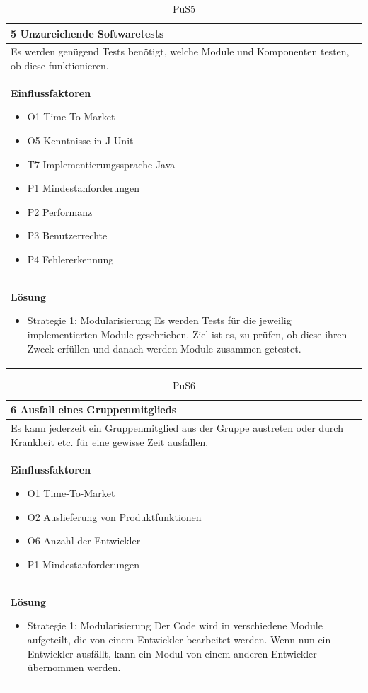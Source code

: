 \documentclass[fontsize=12pt,paper=a4,twoside]{scrartcl}
\begin{document}
\begin{table}[H]
\caption{PuS5}
\begin{tabular}{|p{\textwidth}|}\hline
5 Unzureichende Softwaretests\\ \hline
Es werden genügend Tests benötigt, welche Module und Komponenten testen, ob diese funktionieren.\\ \hline
\textbf{Einflussfaktoren}
\begin{itemize}
\item O1 Time-To-Market
\item O5 Kenntnisse in J-Unit
\item T7 Implementierungssprache Java
\item P1 Mindestanforderungen
\item P2 Performanz
\item P3 Benutzerrechte
\item P4 Fehlererkennung
\end{itemize}\\ \hline
\textbf{Lösung}
\begin{itemize}
\item Strategie 1: Modularisierung \leavevmode\newline
Es werden Tests für die jeweilig implementierten Module geschrieben. Ziel ist es, zu prüfen, ob diese ihren Zweck erfüllen und danach werden Module zusammen getestet. 
\end{itemize} \\ \hline
\end{tabular}
\end{table}

\begin{table}[H]
\caption{PuS6}
\begin{tabular}{|p{\textwidth}|}\hline
6 Ausfall eines Gruppenmitglieds\\ \hline
Es kann jederzeit ein Gruppenmitglied aus der Gruppe austreten oder durch Krankheit etc. für eine gewisse Zeit ausfallen.\\ \hline
\textbf{Einflussfaktoren}
\begin{itemize}
\item O1 Time-To-Market
\item O2 Auslieferung von Produktfunktionen
\item O6 Anzahl der Entwickler
\item P1 Mindestanforderungen
\end{itemize}\\ \hline
\textbf{Lösung}
\begin{itemize}
\item Strategie 1: Modularisierung \leavevmode\newline
Der Code wird in verschiedene Module aufgeteilt, die von einem Entwickler bearbeitet werden. Wenn nun ein Entwickler ausfällt, kann ein Modul von einem anderen Entwickler übernommen werden.
\end{itemize} \\ \hline
\end{tabular}
\end{table}
\end{document}
